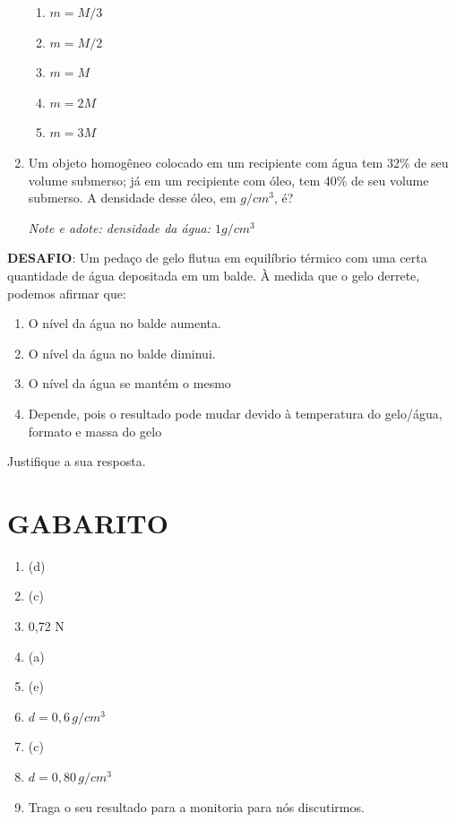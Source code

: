\documentclass[12pt,letterpaper,fleqn]{article}
\begin{document}
\begin{enumerate}
    \begin{enumerate}
        \item $m=M/3$
        \item $m=M/2$
        \item $m=M$
        \item $m=2M$
        \item $m=3M$
    \end{enumerate}
    
    \item Um objeto homogêneo colocado em um recipiente com água tem 32\% de seu volume submerso; já em um recipiente com óleo, tem 40\% de seu volume submerso. A densidade desse óleo, em $g/cm^3$, é?
    
    \textit{Note e adote: densidade da água: $1g/cm^3$}
    \end{enumerate}
    
    \textbf{DESAFIO}: Um pedaço de gelo flutua em equilíbrio térmico com uma certa quantidade de água depositada em um balde. À medida que o gelo derrete, podemos afirmar que:
    \begin{enumerate}
        \item O nível da água no balde aumenta.
        \item O nível da água no balde diminui.
        \item O nível da água se mantém o mesmo
        \item Depende, pois o resultado pode mudar devido à temperatura do gelo/água, formato e massa do gelo
    \end{enumerate}
    Justifique a sua resposta.


\newpage
\section*{GABARITO}
\begin{enumerate}
    \item (d)
    \item (c)
    \item 0,72 N
    \item (a)
    \item (e)
    \item $d = 0,6\,g/cm^3$
    \item (c)
    \item $d=0,80\,g/cm^3$
    \item Traga o seu resultado para a monitoria para nós discutirmos.
\end{enumerate}
\end{document}
